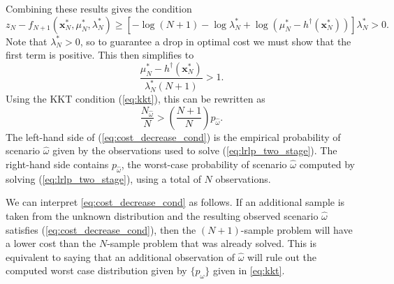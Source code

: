 \documentclass[11pt]{article}
\newcommand{\x}{\mathbf{x}}
\begin{document}
Combining these results gives the condition
\[
	z_N - f_{N+1}(\x^*_N,\mu^*_N,\lambda^*_N) \geq \left[ -\log(N+1) - \log\lambda^*_N + \log(\mu^*_N-h^\dagger(\x^*_N))\right]\lambda^*_N > 0.
\]
Note that $\lambda^*_N > 0$, so to guarantee a drop in optimal cost we must show that the first term is positive.
This then simplifies to
\[
	\frac{\mu^*_N - h^\dagger(\x^*_N)}{\lambda^*_N(N+1)} > 1.
\]
Using the KKT condition (\ref{eq:kkt}), this can be rewritten as
\begin{equation} \label{eq:cost_decrease_cond}
	\frac{N_{\hat{\omega}}}{N} > \left( \frac{N+1}{N} \right) p_{\hat{\omega}}.
\end{equation}
The left-hand side of (\ref{eq:cost_decrease_cond}) is the empirical probability of scenario $\hat{\omega}$ given by the observations used to solve (\ref{eq:lrlp_two_stage}).
The right-hand side contains $p_{\hat{\omega}}$, the worst-case probability of scenario $\hat{\omega}$ computed by solving (\ref{eq:lrlp_two_stage}), using a total of $N$ observations.

We can interpret \eqref{eq:cost_decrease_cond} as follows. If an additional sample is taken from the unknown distribution and the resulting observed scenario $\hat{\omega}$ satisfies (\ref{eq:cost_decrease_cond}), then the $(N+1)$-sample problem will have a lower cost than the $N$-sample problem that was already solved.
This is equivalent to saying that an additional observation of $\hat{\omega}$ will rule out the computed worst case distribution given by $\{p_\omega\}$ given in \eqref{eq:kkt}.
\end{document}
